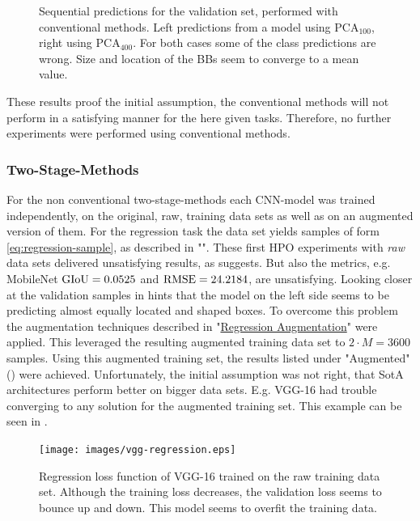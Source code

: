 \begin{figure}[!ht]
\begin{minipage}{.45\textwidth}
    \end{minipage}
    \caption{Sequential predictions for the validation set, performed with conventional methods. Left predictions from a model using $\text{PCA}_{100}$, right using $\text{PCA}_{400}$. For both cases some of the class predictions are wrong. Size and location of the BBs seem to converge to a mean value.}
    \label{fig:conventional-predictions}
\end{figure}
These results proof the initial assumption, the conventional methods will not perform in a satisfying manner for the here given tasks.
Therefore, no further experiments were performed using conventional methods.
\subsubsection{Two-Stage-Methods}
For the non conventional two-stage-methods each CNN-model was trained independently, on the original, raw, training data sets as well as on an augmented version of them.
For the regression task the data set yields samples of form \eqref{eq:regression-sample}, as described in "".
These first HPO experiments with \textit{raw} data sets delivered unsatisfying results, as  suggests.
But also the metrics, e.g. MobileNet $\text{GIoU} = 0.0525$ and $\text{RMSE}=24.2184$, are unsatisfying.
Looking closer at the validation samples in  hints that the model on the left side seems to be predicting almost equally located and shaped boxes.\newline
To overcome this problem the augmentation techniques described in "\hyperref[subsubsec:regression-augmentation]{Regression Augmentation}" were applied.
This leveraged the resulting augmented training data set to $2 \cdot M = 3600$ samples.
Using this augmented training set, the results listed under "Augmented" () were achieved.
Unfortunately, the initial assumption was not right, that SotA architectures perform better on bigger data sets.
E.g. VGG-16 had trouble converging to any solution for the augmented training set.
This example can be seen in .

\begin{figure}[!ht]
    \centering
    \texttt{[image: images/vgg-regression.eps]}
    \caption{Regression loss function of VGG-16 trained on the raw training data set. Although the training loss  decreases, the validation loss  seems to bounce up and down. This model seems to overfit the training data.}
    \label{fig:reg-vgg-loss}
\end{figure}

